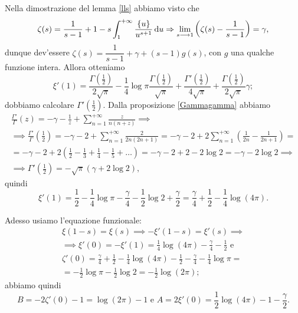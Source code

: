 Nella dimostrazione del lemma \ref{lls} abbiamo visto che
$$\zeta(s)=\frac{1}{s-1}+1-s\int_1^{+\infty} \frac{\{u\}}{u^{s+1}}\mathop{}\!\mathrm{d} u \Rightarrow \lim_{s \longrightarrow 1} \left(\zeta(s)-\frac{1}{s-1}\right)=\gamma,$$
dunque dev'essere $\zeta(s)=\dfrac{1}{s-1}+\gamma+(s-1)g(s)$, con $g$ una qualche funzione intera. Allora otteniamo
$$\xi'(1)=\frac{\Gamma\left(\frac{1}{2}\right)}{2\sqrt{\pi}}-\frac{1}{4}\log{\pi}\frac{\Gamma\left(\frac{1}{2}\right)}{\sqrt{\pi}}+\frac{\Gamma'\left(\frac{1}{2}\right)}{4\sqrt{\pi}}+\frac{\Gamma\left(\frac{1}{2}\right)}{2\sqrt{\pi}}\gamma;$$
dobbiamo calcolare $\Gamma'\left(\frac{1}{2}\right)$. Dalla proposizione \ref{Gammagamma} abbiamo
\begin{gather*}
  \frac{\Gamma'}{\Gamma}(z)=-\gamma-\frac{1}{z}+\sum_{n=1}^{+\infty} \frac{z}{n(n+z)} \implies \\
  \implies \frac{\Gamma'}{\Gamma}\left(\frac{1}{2}\right)=-\gamma-2+\sum_{n=1}^{+\infty} \frac{2}{2n(2n+1)}=-\gamma-2+2\sum_{n=1}^{+\infty} \left(\frac{1}{2n}-\frac{1}{2n+1}\right)= \\
  =-\gamma-2+2\left(\frac{1}{2}-\frac{1}{3}+\frac{1}{4}-\frac{1}{5}+\dots\right)=-\gamma-2+2-2\log{2}=-\gamma-2\log{2} \implies \\
  \implies \Gamma'\left(\frac{1}{2}\right)=-\sqrt{\pi}(\gamma+2\log{2}),
\end{gather*}
quindi
$$\xi'(1)=\frac{1}{2}-\frac{1}{4}\log{\pi}-\frac{\gamma}{4}-\frac{1}{2}\log{2}+\frac{\gamma}{2}=\frac{\gamma}{4}+\frac{1}{2}-\frac{1}{4}\log(4\pi).$$

Adesso usiamo l'equazione funzionale:
\begin{gather*}
  \xi(1-s)=\xi(s) \implies -\xi'(1-s)=\xi'(s) \implies \\
  \implies \xi'(0)=-\xi'(1)=\frac{1}{4}\log(4\pi)-\frac{\gamma}{4}-\frac{1}{2} \text{ e}\\
  \zeta'(0)=\frac{\gamma}{4}+\frac{1}{2}-\frac{1}{4}\log(4\pi)-\frac{1}{2}-\frac{\gamma}{4}-\frac{1}{4}\log{\pi}=\\
  =-\frac{1}{2}\log{\pi}-\frac{1}{2}\log{2}=-\frac{1}{2}\log(2\pi);
\end{gather*}
abbiamo quindi
$$B=-2\zeta'(0)-1=\log(2\pi)-1 \text{ e }A=2\xi'(0)=\frac{1}{2}\log(4\pi)-1-\frac{\gamma}{2}.$$

